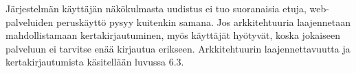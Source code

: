 Järjestelmän käyttäjän näkökulmasta uudistus ei tuo suoranaisia etuja, web-pal\-ve\-lui\-den peruskäyttö pysyy kuitenkin samana. Jos arkkitehtuuria laajennetaan mahdollistamaan kertakirjautuminen, myös käyttäjät hyötyvät, koska jokaiseen palveluun ei tarvitse enää kirjautua erikseen. Arkkitehtuurin laajennettavuutta ja kertakirjautumista käsitellään luvussa 6.3.
